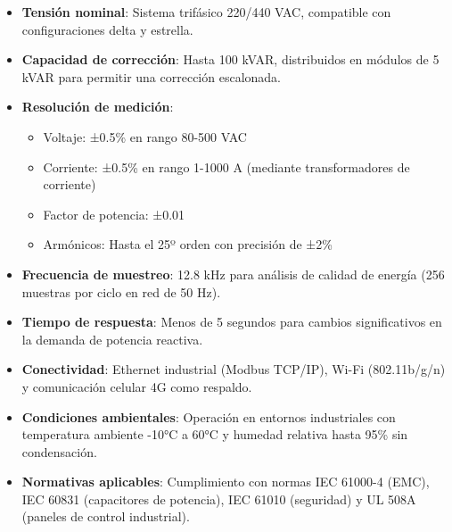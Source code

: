 \documentclass{report}          %
\begin{document}
                \begin{itemize}
                    \item \textbf{Tensión nominal}: Sistema trifásico 220/440 VAC, compatible con configuraciones delta y estrella.
                    
                    \item \textbf{Capacidad de corrección}: Hasta 100 kVAR, distribuidos en módulos de 5 kVAR para permitir una corrección escalonada.
                    
                    \item \textbf{Resolución de medición}: 
                    \begin{itemize}
                        \item Voltaje: ±0.5\% en rango 80-500 VAC
                        \item Corriente: ±0.5\% en rango 1-1000 A (mediante transformadores de corriente)
                        \item Factor de potencia: ±0.01
                        \item Armónicos: Hasta el 25º orden con precisión de ±2\%
                    \end{itemize}
                    
                    \item \textbf{Frecuencia de muestreo}: 12.8 kHz para análisis de calidad de energía (256 muestras por ciclo en red de 50 Hz).
                    
                    \item \textbf{Tiempo de respuesta}: Menos de 5 segundos para cambios significativos en la demanda de potencia reactiva.
                    
                    \item \textbf{Conectividad}: Ethernet industrial (Modbus TCP/IP), Wi-Fi (802.11b/g/n) y comunicación celular 4G como respaldo.
                    
                    \item \textbf{Condiciones ambientales}: Operación en entornos industriales con temperatura ambiente -10°C a 60°C y humedad relativa hasta 95\% sin condensación.
                    
                    \item \textbf{Normativas aplicables}: Cumplimiento con normas IEC 61000-4 (EMC), IEC 60831 (capacitores de potencia), IEC 61010 (seguridad) y UL 508A (paneles de control industrial).
                \end{itemize}
            
\end{document}
